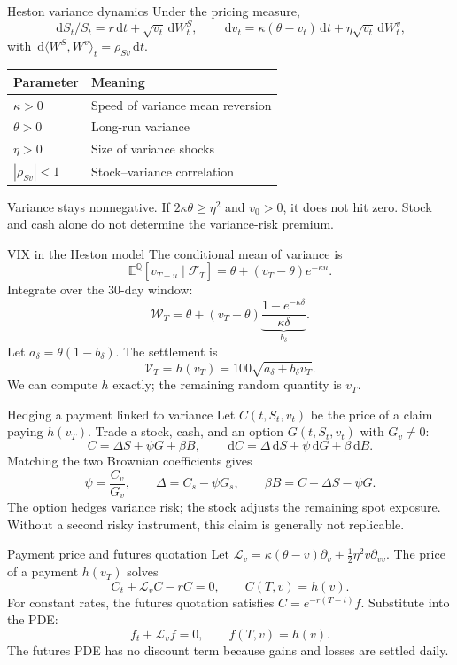 \documentclass[handout,10pt,t,aspectratio=169]{beamer}
\newcommand{\E}{\mathbb E}
\newcommand{\Q}{\mathbb Q}
\newcommand{\F}{\mathcal F}
\newcommand{\dd}{\,\mathrm d}
\begin{document}
\begin{frame}{Heston variance dynamics}
\small
Under the pricing measure,
\[
 \dd S_t/S_t=r\dd t+\sqrt{v_t}\dd W_t^S,\qquad
 \dd v_t=\kappa(\theta-v_t)\dd t+\eta\sqrt{v_t}\dd W_t^v,
\]
with \(\dd\langle W^S,W^v\rangle_t=\rho_{Sv}\dd t\).
\begin{center}\begin{tabular}{ll}
\toprule Parameter & Meaning\\\midrule
\(\kappa>0\) & Speed of variance mean reversion\\
\(\theta>0\) & Long-run variance\\
\(\eta>0\) & Size of variance shocks\\
\(|\rho_{Sv}|<1\) & Stock--variance correlation\\\bottomrule
\end{tabular}\end{center}
Variance stays nonnegative. If \(2\kappa\theta\geq\eta^2\) and \(v_0>0\), it does not hit zero.
Stock and cash alone do not determine the variance-risk premium.
\end{frame}

\begin{frame}{VIX in the Heston model}
\small
The conditional mean of variance is
\[
 \E^\Q[v_{T+u}\mid\F_T]=\theta+(v_T-\theta)e^{-\kappa u}.
\]
Integrate over the 30-day window:
\[
 \mathcal W_T=\theta+(v_T-\theta)
 \underbrace{\frac{1-e^{-\kappa\delta}}{\kappa\delta}}_{b_\delta}.
\]
Let \(a_\delta=\theta(1-b_\delta)\). The settlement is
\[
 \boxed{\mathcal V_T=h(v_T)=100\sqrt{a_\delta+b_\delta v_T}.}
\]
We can compute \(h\) exactly; the remaining random quantity is \(v_T\).
\end{frame}

\begin{frame}{Hedging a payment linked to variance}
\small
Let \(C(t,S_t,v_t)\) be the price of a claim paying \(h(v_T)\).
Trade a stock, cash, and an option \(G(t,S_t,v_t)\) with \(G_v\ne0\):
\[
 C=\Delta S+\psi G+\beta B,\qquad
 \dd C=\Delta\dd S+\psi\dd G+\beta\dd B.
\]
Matching the two Brownian coefficients gives
\[
 \boxed{\psi=\frac{C_v}{G_v},\qquad\Delta=C_s-\psi G_s,\qquad
 \beta B=C-\Delta S-\psi G.}
\]
The option hedges variance risk; the stock adjusts the remaining spot exposure.
Without a second risky instrument, this claim is generally not replicable.
\end{frame}

\begin{frame}{Payment price and futures quotation}
\small
Let \(\mathcal L_v=\kappa(\theta-v)\partial_v+\tfrac12\eta^2v\partial_{vv}\).
The price of a payment \(h(v_T)\) solves
\[
 C_t+\mathcal L_vC-rC=0,\qquad C(T,v)=h(v).
\]
For constant rates, the futures quotation satisfies \(C=e^{-r(T-t)}f\).
Substitute into the PDE:
\[
 \boxed{f_t+\mathcal L_vf=0,\qquad f(T,v)=h(v).}
\]
The futures PDE has no discount term because gains and losses are settled daily.
\end{frame}
\end{document}
